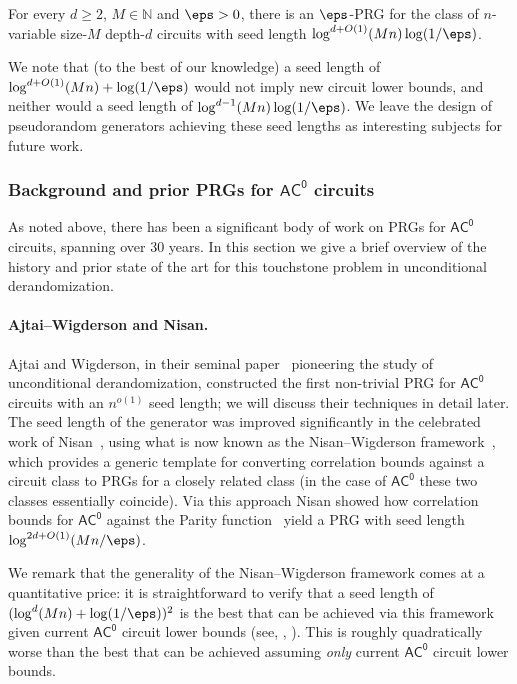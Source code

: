 \documentclass{toc}
\theoremstyle{plain}
\newcommand{\acz}{\mathsf{AC^0}}
\renewcommand{\N}{\mathds{N}}
\begin{document}
%
%
%
%
%
%
%
%
%
%
%

\begin{theorem}[PRG for $\acz$ circuits] \label{thm:first}
For every $d\ge 2$, $M\in \N$ and $\eps > 0$, there is an $\eps$-PRG for the class of $n$-variable size-$M$ depth-$d$ circuits with seed length $\log^{d+O(1)}(Mn)\log(1/\eps)$. 
\end{theorem}

We note that (to the best of our knowledge) a seed length of $\log^{d+O(1)}(Mn) + \log(1/\eps)$ would not imply new circuit lower bounds, and neither would a seed length of $\log^{d-1}(Mn)\log(1/\eps)$.  We leave the design of pseudorandom generators achieving these seed lengths as interesting subjects for future work.

\subsubsection{Background and prior PRGs for $\acz$ circuits}  \label{sec:background-acz}

As noted above,  %
there has been a significant body of work on PRGs for $\acz$ circuits, spanning over 30 years. In this section we give a brief overview of the history and prior %
state of the art  %
for this touchstone problem in unconditional derandomization. 

\vspace{-5pt} 

\paragraph{Ajtai--Wigderson and Nisan.}
Ajtai and Wigderson, in their seminal %
paper~\cite{AjtaiWigderson:85}   %
pioneering the study of unconditional derandomization, constructed the first non-trivial PRG for $\acz$ circuits with an $n^{o(1)}$ seed length; we will discuss their techniques in detail later. The seed length of the \cite{AjtaiWigderson:85} generator was improved significantly in the celebrated work of Nisan~\cite{Nis91}, using what is now known as the Nisan--Wigderson framework~\cite{NW94}, which provides a generic template for converting correlation bounds against a circuit class to PRGs for a closely related class (in the case of $\acz$ these two classes essentially coincide).  Via this approach Nisan showed how correlation bounds for $\acz$ against the {\sc Parity} function~\cite{Hastad86} yield a PRG with seed length  $\log^{2d+O(1)}(Mn/\eps)$. 

We remark that the generality of the Nisan--Wigderson framework comes at a quantitative price: it is straightforward to verify that a seed length of $(\log^{d}(Mn) + \log(1/\eps))^2$ is the best that can be achieved via this framework given current $\acz$ circuit lower bounds (see, \eg, \cite{TX13,HS16journal}). This is roughly quadratically worse than
%
the best that can be achieved assuming \emph{only} current $\acz$ circuit lower bounds.
\end{document}
